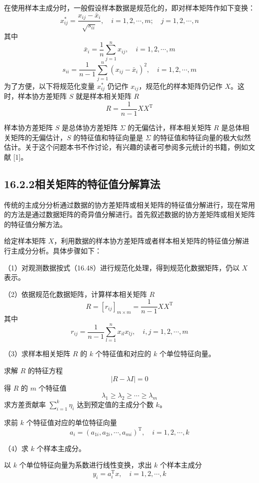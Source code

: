 \documentclass[UTF8,12pt,a4paper,fontset=fandol]{ctexart}
\begin{document}
在使用样本主成分时，一般假设样本数据是规范化的，即对样本矩阵作如下变换：
\begin{equation}
x_{ij}^*=\frac{x_{ij}-\bar x_i}{\sqrt{s_{ii}}},\quad i=1,2,\cdots,m;\quad j=1,2,\cdots,n
\tag{16.48}
\end{equation}
其中
\[
\bar x_i=\frac{1}{n}\sum_{j=1}^n x_{ij},\quad i=1,2,\cdots,m
\]
\[
s_{ii}=\frac{1}{n-1}\sum_{j=1}^n(x_{ij}-\bar x_i)^2,\quad i=1,2,\cdots,m
\]
为了方便，以下将规范化变量 $x_{ij}^*$ 仍记作 $x_{ij}$，规范化的样本矩阵仍记作 $X$。这时，样本协方差矩阵 $S$ 就是样本相关矩阵 $R$
\begin{equation}
R=\frac{1}{n-1}XX^{\mathrm{T}}
\tag{16.49}
\end{equation}

样本协方差矩阵 $S$ 是总体协方差矩阵 $\Sigma$ 的无偏估计，样本相关矩阵 $R$ 是总体相关矩阵的无偏估计，$S$ 的特征值和特征向量是 $\Sigma$ 的特征值和特征向量的极大似然估计。关于这个问题本书不作讨论，有兴趣的读者可参阅多元统计的书籍，例如文献 [1]。

\subsection*{16.2.2\quad 相关矩阵的特征值分解算法}

传统的主成分分析通过数据的协方差矩阵或相关矩阵的特征值分解进行，现在常用的方法是通过数据矩阵的奇异值分解进行。首先叙述数据的协方差矩阵或相关矩阵的特征值分解方法。

给定样本矩阵 $X$，利用数据的样本协方差矩阵或者样本相关矩阵的特征值分解进行主成分分析。具体步骤如下：

（1）对观测数据按式（16.48）进行规范化处理，得到规范化数据矩阵，仍以 $X$ 表示。

（2）依据规范化数据矩阵，计算样本相关矩阵 $R$
\[
R=[r_{ij}]_{m\times m}=\frac{1}{n-1}XX^{\mathrm{T}}
\]
其中
\[
r_{ij}=\frac{1}{n-1}\sum_{l=1}^n x_{il}x_{lj},\quad i,j=1,2,\cdots,m
\]

（3）求样本相关矩阵 $R$ 的 $k$ 个特征值和对应的 $k$ 个单位特征向量。

求解 $R$ 的特征方程
\[
|R-\lambda I|=0
\]
得 $R$ 的 $m$ 个特征值
\[
\lambda_1\geqslant\lambda_2\geqslant\cdots\geqslant\lambda_m
\]
求方差贡献率 $\sum_{i=1}^k\eta_i$ 达到预定值的主成分个数 $k$。

求前 $k$ 个特征值对应的单位特征向量
\[
a_i=(a_{1i},a_{2i},\cdots,a_{mi})^{\mathrm{T}},\quad i=1,2,\cdots,k
\]

（4）求 $k$ 个样本主成分。

以 $k$ 个单位特征向量为系数进行线性变换，求出 $k$ 个样本主成分
\begin{equation}
y_i=a_i^{\mathrm{T}}x,\quad i=1,2,\cdots,k
\tag{16.50}
\end{equation}
\end{document}
